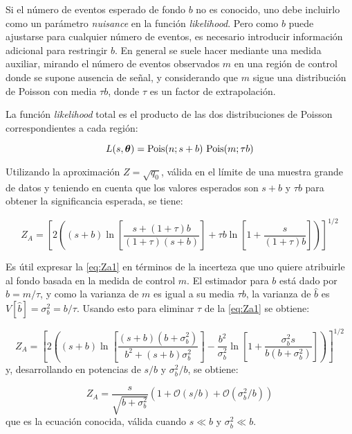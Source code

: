 Si el número de eventos esperado de fondo $b$ no es conocido, uno debe incluirlo
como un parámetro \emph{nuisance} en la función \emph{likelihood}. Pero como $b$ puede
ajustarse para cualquier número de eventos, es necesario introducir información
adicional para restringir $b$. En general se suele hacer mediante una medida
auxiliar, mirando el número de eventos observados $m$ en una región de control
donde se supone ausencia de señal, y considerando que $m$ sigue
una distribución de Poisson con media $\tau b$, donde $\tau$ es un factor de
extrapolación.

La función \emph{likelihood} total es el producto de las dos distribuciones de Poisson
correspondientes a cada región:

\begin{equation}
  L(s, \bm{\theta}) = \operatorname{Pois} (n;s+b) \, \operatorname{Pois}(m;\tau b)
\end{equation}

Utilizando la aproximación $Z = \sqrt{q_0}$, válida en el límite de una muestra
grande de datos y teniendo en cuenta que los valores esperados son $s+b$ y $\tau b$
para obtener la significancia esperada, se tiene:

\begin{equation}
  Z_A = \left[ 2 \left( (s+b) \ln \left[ \frac{s+(1+\tau)b}{(1+\tau)(s+b)}
      \right] + \tau b \ln \left[ 1 + \frac{s}{(1+\tau)b} \right] \right)
    \right]^{1/2}
  \label{eq:Za1}
\end{equation}

Es útil expresar la \cref{eq:Za1} en términos de la incerteza que uno
quiere atribuirle al fondo basada en la medida de control $m$. El estimador
para $b$ está dado por $\hat{b} = m/\tau$, y como la varianza de $m$ es igual a
su media $\tau b$, la varianza de $\hat{b}$ es $V[\hat{b}] = \sigma_b^2 =
b/\tau$. Usando esto para eliminar $\tau$ de la \cref{eq:Za1}
se obtiene:

\begin{equation}
  Z_A = \left[ 2 \left( (s+b) \ln \left[
      \frac{(s+b)(b+\sigma_b^2)}{b^2+(s+b)\sigma_b^2} \right] -
    \frac{b^2}{\sigma_b^2} \ln \left[ 1 + \frac{\sigma_b^2 s}{b(b+\sigma_b^2)}
      \right] \right) \right]^{1/2}
  \label{eq:Za}
\end{equation}
%
y, desarrollando en potencias de $s/b$ y $\sigma_b^2/b$, se obtiene:

\begin{equation}
  Z_A = \frac{s}{\sqrt{b+\sigma_b^2}} \left( 1 + \mathcal{O}(s/b) + \mathcal{O}(\sigma_b^2/b) \right)
\end{equation}
%
que es la ecuación conocida, válida cuando $s\ll b$ y $\sigma_b^2 \ll b$.
